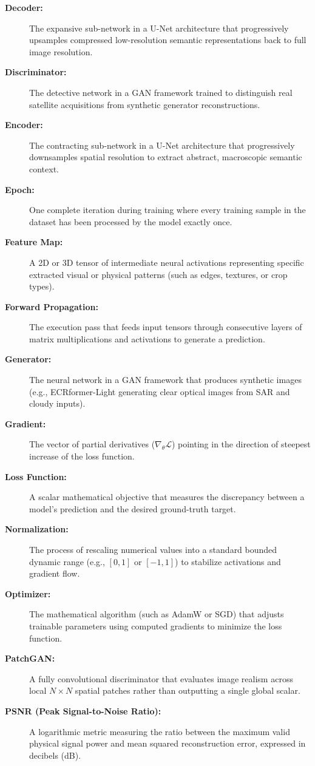 \begin{description}
    \item[\textbf{Decoder:}] The expansive sub-network in a U-Net architecture that progressively upsamples compressed low-resolution semantic representations back to full image resolution.
    \item[\textbf{Discriminator:}] The detective network in a GAN framework trained to distinguish real satellite acquisitions from synthetic generator reconstructions.
    \item[\textbf{Encoder:}] The contracting sub-network in a U-Net architecture that progressively downsamples spatial resolution to extract abstract, macroscopic semantic context.
    \item[\textbf{Epoch:}] One complete iteration during training where every training sample in the dataset has been processed by the model exactly once.
    \item[\textbf{Feature Map:}] A 2D or 3D tensor of intermediate neural activations representing specific extracted visual or physical patterns (such as edges, textures, or crop types).
    \item[\textbf{Forward Propagation:}] The execution pass that feeds input tensors through consecutive layers of matrix multiplications and activations to generate a prediction.
    \item[\textbf{Generator:}] The neural network in a GAN framework that produces synthetic images (e.g., ECRformer-Light generating clear optical images from SAR and cloudy inputs).
    \item[\textbf{Gradient:}] The vector of partial derivatives ($\nabla_\theta \mathcal{L}$) pointing in the direction of steepest increase of the loss function.
    \item[\textbf{Loss Function:}] A scalar mathematical objective that measures the discrepancy between a model's prediction and the desired ground-truth target.
    \item[\textbf{Normalization:}] The process of rescaling numerical values into a standard bounded dynamic range (e.g., $[0, 1]$ or $[-1, 1]$) to stabilize activations and gradient flow.
    \item[\textbf{Optimizer:}] The mathematical algorithm (such as AdamW or SGD) that adjusts trainable parameters using computed gradients to minimize the loss function.
    \item[\textbf{PatchGAN:}] A fully convolutional discriminator that evaluates image realism across local $N \times N$ spatial patches rather than outputting a single global scalar.
    \item[\textbf{PSNR (Peak Signal-to-Noise Ratio):}] A logarithmic metric measuring the ratio between the maximum valid physical signal power and mean squared reconstruction error, expressed in decibels (dB).

\end{description}
